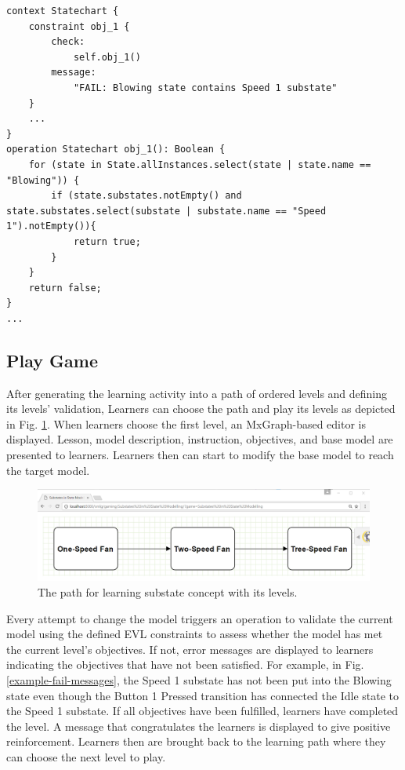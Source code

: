 \documentclass[conference]{IEEEtran}
\begin{document}
\begin{lstlisting}[style=interfaces,caption={Validation realisation for Objective 1 in One-Speed Fan activity/level.}, label=validation-realisation]
context Statechart {
    constraint obj_1 {
        check: 
            self.obj_1()
        message:
            "FAIL: Blowing state contains Speed 1 substate"
    }
    ...
}
operation Statechart obj_1(): Boolean {
    for (state in State.allInstances.select(state | state.name == "Blowing")) {
        if (state.substates.notEmpty() and state.substates.select(substate | substate.name == "Speed 1").notEmpty()){
            return true;
        }        
    }
    return false;
}
...
\end{lstlisting} 

\subsection{Play Game}
After generating the learning activity into a path of ordered levels and defining its levels' validation, Learners can choose the path and play its levels as depicted in Fig. \ref{path}. When learners choose the first level, an MxGraph-based editor is displayed. Lesson, model description, instruction, objectives, and base model are presented to learners. Learners then can start to modify the base model to reach the target model. 

\begin{figure}[!t]
\centering
\includegraphics[width=\linewidth]{path}
\caption{The path for learning substate concept with its levels.}
\label{path}
\end{figure}    

Every attempt to change the model triggers an operation to validate the current model using the defined EVL constraints to assess whether the model has met the current level's objectives. If not, error messages are displayed to learners indicating the objectives that have not been satisfied. For example, in Fig. \ref{example-fail-messages}, the Speed 1 substate has not been put into the Blowing state even though the Button 1 Pressed transition has connected the Idle state to the Speed 1 substate. If all objectives have been fulfilled, learners have completed the level. A message that congratulates the learners is displayed to give positive reinforcement. Learners then are brought back to the learning path where they can choose the next level to play.  
\end{document}
